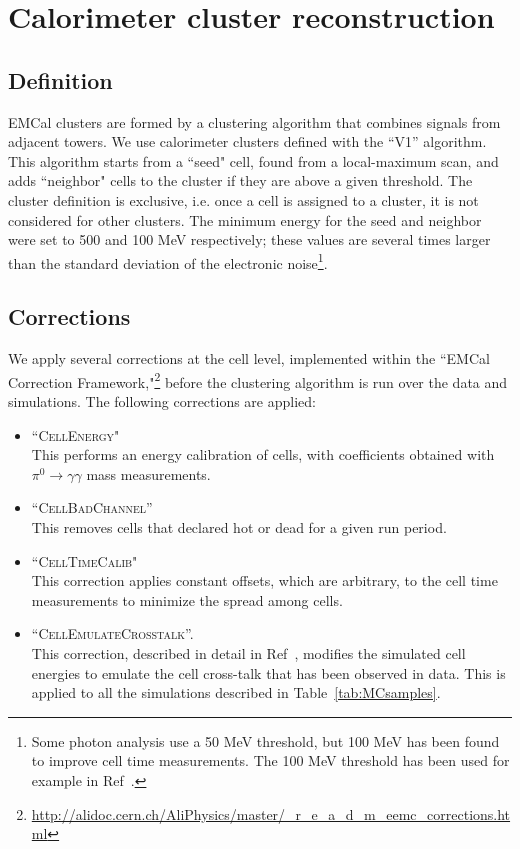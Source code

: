 \section{Calorimeter cluster reconstruction}
\label{sec:clusterselection}
\subsection{Definition}
EMCal clusters are formed by a clustering algorithm that combines signals from adjacent towers. We use calorimeter clusters defined with the ``V1'' algorithm. This algorithm starts from a ``seed" cell, found from a local-maximum scan, and adds ``neighbor" cells to the cluster if they are above a given threshold. The cluster definition is exclusive, i.e. once a cell is assigned to a cluster, it is not considered for other clusters. The minimum energy for the seed and neighbor were set to 500 and 100 MeV respectively; these values are several times larger than the standard deviation of the electronic noise\footnote{Some photon analysis use a 50 MeV threshold, but 100 MeV has been found to improve cell time measurements. The 100 MeV threshold has been used for example in Ref~\cite{Acharya:2017tlv}.}.

\subsection{Corrections}
We apply several corrections at the cell level, implemented within the ``EMCal Correction Framework,"\footnote{\url{http://alidoc.cern.ch/AliPhysics/master/_r_e_a_d_m_eemc_corrections.html} } before the clustering algorithm is run over the data and simulations. The following corrections are applied: 
\begin{itemize}
\item ``\textsc{CellEnergy}"\\
This performs an energy calibration of cells, with coefficients obtained with $\pi^{0}\to\gamma\gamma$ mass measurements.
\item ``\textsc{CellBadChannel}''\\
This removes cells that declared hot or dead for a given run period. 
\item ``\textsc{CellTimeCalib}"\\
This correction applies constant offsets, which are arbitrary, to the cell time measurements to minimize the spread among cells. 
\item ``\textsc{CellEmulateCrosstalk}''. \\
This correction, described in detail in Ref~\cite{CrossTalk}, modifies the simulated cell energies to emulate the cell cross-talk that has been observed in data. This is applied to all the simulations described in Table~\ref{tab:MCsamples}. 
\end{itemize}

